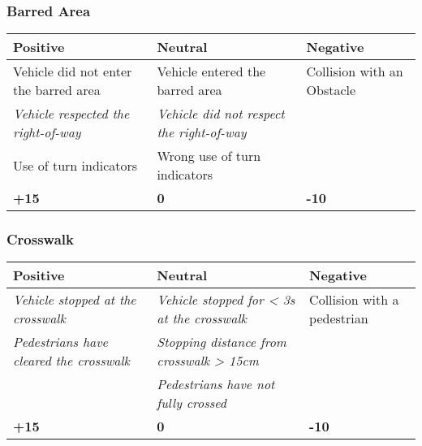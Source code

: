 {	\subsubsection*{Barred Area}
	\begin{table}[H]
		\begin{tabularx}{\textwidth}{XXX}
			\toprule
			\textbf{Positive}                                           & \textbf{Neutral}                                                  & \textbf{Negative}          \\
			\midrule
			Vehicle did not enter the barred area                       & Vehicle entered the barred area                                   & Collision with an Obstacle \\
			\textit{Vehicle respected the right-of-way}\footnotemark[1] & \textit{Vehicle did not respect the right-of-way}\footnotemark[1] &                            \\
			Use of turn indicators                                      & Wrong use of turn indicators                                      &                            \\
			\topstrut
			\textbf{+15}                                                & \textbf{0}                                                        & \textbf{-10}               \\
			\bottomrule
		\end{tabularx}
	\end{table}

	\subsubsection*{Crosswalk}
	\begin{table}[H]
		\begin{tabularx}{\textwidth}{XXX}
			\toprule
			\textbf{Positive}                                               & \textbf{Neutral}                                                   & \textbf{Negative}           \\
			\midrule
			\textit{Vehicle stopped at the crosswalk}\footnotemark[2]       & \textit{Vehicle stopped for < 3s at the crosswalk}\footnotemark[2] & Collision with a pedestrian \\
			\textit{Pedestrians have cleared the crosswalk}\footnotemark[2] & \textit{Stopping distance from crosswalk > 15cm}\footnotemark[2]   &                             \\
			                                                                & \textit{Pedestrians have not fully crossed}\footnotemark[2]        &                             \\
			\topstrut
			\textbf{+15}                                                    & \textbf{0}                                                         & \textbf{-10}                \\
			\bottomrule
		\end{tabularx}
	\end{table}

}
